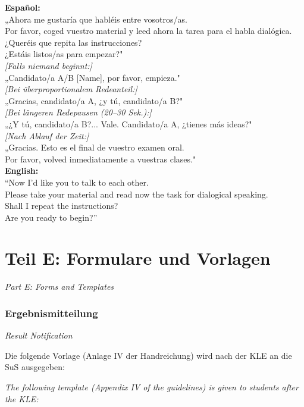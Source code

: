 \documentclass[11pt,a4paper]{article}
\newcommand{\bipar}[2]{%
    #1\par\vspace{2pt}%
    {\small\color{englishgray}\textit{#2}}\par\vspace{8pt}%
}
\newcommand{\bisection}[2]{%
    \section{#1}%
    {\small\color{englishgray}\textit{#2}}\par\vspace{6pt}%
}
\begin{document}
\begin{tcolorbox}[colback=lightgray, colframe=spanischrot, title=Gesprächsleitung / \textit{Discussion Leader}]
\textbf{Español:}\\
„Ahora me gustaría que habléis entre vosotros/as.\\
Por favor, coged vuestro material y leed ahora la tarea para el habla dialógica.\\
¿Queréis que repita las instrucciones?\\
¿Estáis listos/as para empezar?"\\[0.3cm]
\textit{[Falls niemand beginnt:]}\\
„Candidato/a A/B [Name], por favor, empieza."\\[0.2cm]
\textit{[Bei überproportionalem Redeanteil:]}\\
„Gracias, candidato/a A, ¿y tú, candidato/a B?"\\[0.2cm]
\textit{[Bei längeren Redepausen (20--30 Sek.):]}\\
„¿Y tú, candidato/a B?... Vale. Candidato/a A, ¿tienes más ideas?"\\[0.2cm]
\textit{[Nach Ablauf der Zeit:]}\\
„Gracias. Esto es el final de vuestro examen oral.\\
Por favor, volved inmediatamente a vuestras clases."\\[0.3cm]
{\color{englishgray}\textbf{English:}\\
``Now I'd like you to talk to each other.\\
Please take your material and read now the task for dialogical speaking.\\
Shall I repeat the instructions?\\
Are you ready to begin?''}
\end{tcolorbox}

\newpage
\part*{\color{spanischrot}Teil E: Formulare und Vorlagen}
{\large\color{englishgray}\textit{Part E: Forms and Templates}}

\bisection{Ergebnismitteilung}{Result Notification}

\bipar{Die folgende Vorlage (Anlage IV der Handreichung) wird nach der KLE an die SuS ausgegeben:}{The following template (Appendix IV of the guidelines) is given to students after the KLE:}
\end{document}
